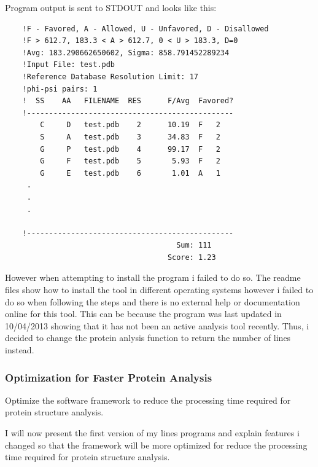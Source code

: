 \documentclass[]{final_report}
\begin{document}
Program output is sent to STDOUT and looks like this:

\begin{lstlisting}
    !F - Favored, A - Allowed, U - Unfavored, D - Disallowed
    !F > 612.7, 183.3 < A > 612.7, 0 < U > 183.3, D=0
    !Avg: 183.290662650602, Sigma: 858.791452289234
    !Input File: test.pdb
    !Reference Database Resolution Limit: 17
    !phi-psi pairs: 1
    !  SS    AA   FILENAME  RES      F/Avg  Favored?
    !-----------------------------------------------
        C     D   test.pdb    2      10.19  F   2
        S     A   test.pdb    3      34.83  F   2
        G     P   test.pdb    4      99.17  F   2
        G     F   test.pdb    5       5.93  F   2
        G     E   test.pdb    6       1.01  A   1
     .
     .
     .

    !-----------------------------------------------
                                       Sum: 111
                                     Score: 1.23
\end{lstlisting}

However when attempting to install the program i failed to do so. The readme files show how to install the tool in different operating systems however i failed to do so when following the steps and there is no external help or documentation online for this tool. This can be because the program was last updated in 10/04/2013 showing that it has not been an active analysis tool recently. Thus, i decided to change the protein anlysis function to return the number of lines instead.
\clearpage

\subsubsection{Optimization for Faster Protein Analysis}

\begin{displayquote}
    Optimize the software framework to reduce the processing time required for protein structure analysis.
\end{displayquote}

I will now present the first version of my lines programs and explain features i changed so that the framework will be more optimized for reduce the processing time required for protein structure analysis.
\end{document}
